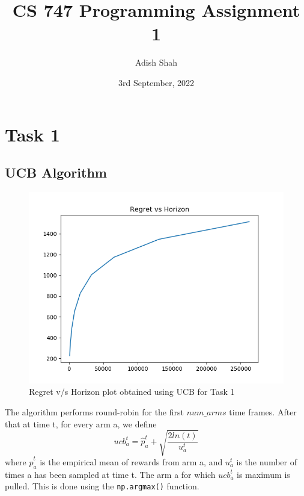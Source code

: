 \documentclass{article}
\begin{document}
\title{CS 747 Programming Assignment 1}
\author{Adish Shah}
\date{3rd September, 2022}
\maketitle
\tableofcontents
\thispagestyle{empty}



\maketitle

\newpage
\thispagestyle{fancy}

\section{Task 1}

\subsection{UCB Algorithm}
\begin{figure}[H]
    \centerline{\includegraphics[scale=0.75]{task1-UCB-20220831-143044.png}}
    \caption{Regret v/s Horizon plot obtained using UCB for Task 1}
\end{figure}

The algorithm performs round-robin for the first $num\_arms$ time frames. After that 
at time t, for every arm a, we define 
\[ ucb_{a}^{t} = \hat{p}^{t}_{a} + \sqrt{\frac{2ln(t)}{u_{a}^{t}}}\]
where $\hat{p}^{t}_{a}$ is the empirical mean of rewards from arm a, and
$u_{a}^{t}$ is the number of times a has been sampled at time t. 
The arm a for which $ucb_{a}^{t}$ is maximum is pulled. This is done using the \verb!np.argmax()! function.
\end{document}
